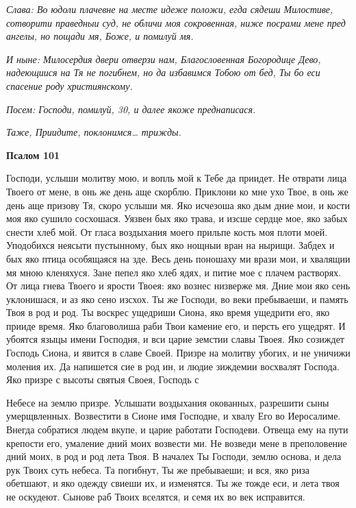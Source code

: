  \itshape Слава:\normalfont{} Во юдоли плачевне на месте идеже положи, егда сядеши
Милостиве, сотворити праведныи суд, не обличи моя сокровенная,
ниже посрами мене пред ангелы, но пощади мя, Боже, и помилуй
мя.


 \itshape И ныне:\normalfont{} Милосердия двери отверзи нам, Благословенная Богородице
Дево, надеющиися на Тя не погибнем, но да избавимся Тобою от бед, Ты бо
еси спасение роду християнскому.


 \itshape Посем:\normalfont{} Господи, помилуй, \itshape 30, и далее якоже преднаписася.\normalfont{}


 \itshape Таже,\normalfont{} Приидите, поклонимся… \itshape трижды.\normalfont{}



 

\bfseries Псалом 101\normalfont{}


   Господи, услыши молитву мою, и вопль мой к Тебе да приидет. Не
отврати лица Твоего от мене, в онь же день аще скорблю. Приклони ко мне
ухо Твое, в онь же день аще призову Тя, скоро услыши мя. Яко исчезоша
яко дым дние мои, и кости моя яко сушило сосхошася. Уязвен бых
яко трава, и изсше сердце мое, яко забых снести хлеб мой. От гласа
воздыхания моего прильпе кость моя плоти моей. Уподобихся неясыти
пустынному, бых яко нощныи вран на нырищи. Забдех и бых яко птица
особящаяся на зде. Весь день поношаху ми врази мои, и хвалящии мя
мною кленяхуся. Зане пепел яко хлеб ядях, и питие мое с плачем
растворях. От лица гнева Твоего и ярости Твоея: яко вознес низверже
мя. Дние мои яко сень уклонишася, и аз яко сено изсхох. Ты же
Господи, во веки пребываеши, и память Твоя в род и род. Ты воскрес
ущедриши Сиона, яко время ущедрити его, яко прииде время. Яко
благоволиша раби Твои камение его, и персть его ущедрят. И убоятся языцы
имени Господня, и вси царие земстии славы Твоея. Яко созиждет
Господь Сиона, и явится в славе Своей. Призре на молитву убогих, и не
уничижи моления их. Да напишется сие в род ин, и людие зиждемии
восхвалят Господа. Яко призре с высоты святыя Своея, Господь с

Небесе на землю призре. Услышати воздыхания окованных, разрешити
сыны умерщвленных. Возвестити в Сионе имя Господне, и хвалу Его
во Иеросалиме. Внегда собратися людем вкупе, и царие работати
Господеви. Отвеща ему на пути крепости его, умаление дний моих
возвести ми. Не возведи мене в преполовение дний моих, в род и
род лета Твоя. В началех Ты Господи, землю основа, и дела рук
Твоих суть небеса. Та погибнут, Ты же пребываеши; и вся, яко риза
обетшают, и яко одежду свиеши их, и изменятся. Ты же тожде еси, и
лета твоя не оскудеют. Сынове раб Твоих вселятся, и семя их во век
исправится.



